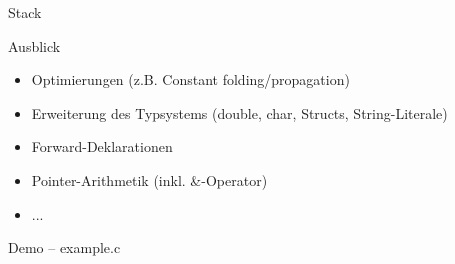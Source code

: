 \documentclass{beamer}
\begin{document}
\begin{frame}{Stack}

\end{frame}

\begin{frame}{Ausblick}
\begin{itemize}
	\item Optimierungen (z.B. Constant folding/propagation)
	\item Erweiterung des Typsystems (double, char, Structs, String-Literale)
	\item Forward-Deklarationen
	\item Pointer-Arithmetik (inkl. \&-Operator)
	\item ...
\end{itemize}
\end{frame}

\begin{frame}{Demo -- example.c}
\end{frame}
\end{document}
